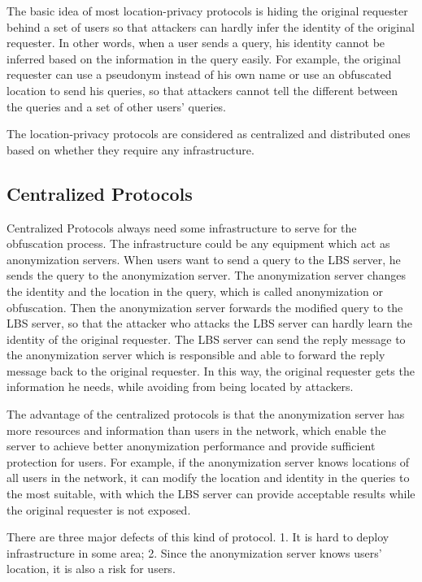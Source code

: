 \noindent The basic idea of most location-privacy protocols is hiding the original requester behind a set of users so that attackers can hardly infer the identity of the original requester. In other words, when a user sends a query, his identity cannot be inferred based on the information in the query easily. For example, the original requester can use a pseudonym instead of his own name or use an obfuscated location to send his queries, so that attackers cannot tell the different between the queries and a set of other users' queries. 

The location-privacy protocols are considered as centralized and distributed ones based on whether they require any infrastructure. 


\subsection{ Centralized Protocols}

\noindent Centralized Protocols always need some infrastructure to serve for the obfuscation process. The infrastructure could be any equipment which act as anonymization servers. When users want to send a query to the LBS server, he sends the query to the anonymization server. The anonymization server changes the identity and the location in the query, which is called anonymization or obfuscation. Then the anonymization server forwards the modified query to the LBS server, so that the attacker who attacks the LBS server can hardly learn the identity of the original requester. The LBS server can send the reply message to the anonymization server which is responsible and able to forward the reply message back to the original requester. In this way, the original requester gets the information he needs, while avoiding from being located by attackers.

The advantage of the centralized protocols is that the anonymization server has more resources and information than users in the network, which enable the server to achieve better anonymization performance and provide sufficient protection for users. For example, if the anonymization server knows locations of all users in the network, it can modify the location and identity in the queries to the most suitable, with which the LBS server can provide acceptable results while the original requester is not exposed.

There are three major defects of this kind of protocol. 1. It is hard to deploy infrastructure in some area; 2. Since the anonymization server knows users' location, it is also a risk for users.


